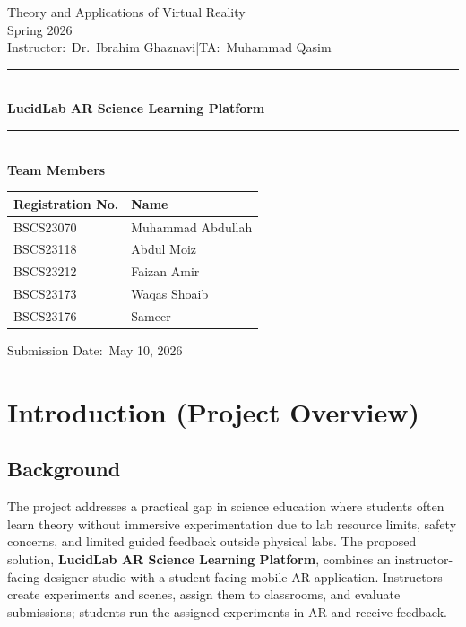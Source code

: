 \documentclass[12pt,a4paper]{article}
\newcommand{\coursename}{Theory and Applications of Virtual Reality}
\newcommand{\semester}{Spring 2026}
\newcommand{\instructor}{Dr.\ Ibrahim Ghaznavi}
\newcommand{\ta}{Muhammad Qasim}
\newcommand{\projecttitle}{LucidLab AR Science Learning Platform}
\newcommand{\submissiondate}{May 10, 2026}
\begin{document}
\begin{titlepage}
  \thispagestyle{empty}
  \begin{center}
    \vspace*{1.5cm}
    {\large \coursename}\\[0.3cm]
    {\large \semester}\\[0.2cm]
    {\small Instructor:\ \instructor \quad|\quad TA:\ \ta}\\[1.2cm]

    \rule{\textwidth}{1.2pt}\\[0.6cm]
    {\LARGE \bfseries \projecttitle}\\[0.4cm]
    \rule{\textwidth}{1.2pt}\\[1.4cm]

    {\large \bfseries Team Members}\\[0.5cm]
    \begin{tabular}{@{}ll@{}}
      \toprule
      \textbf{Registration No.} & \textbf{Name} \\
      \midrule
      BSCS23070 & Muhammad Abdullah \\
      BSCS23118 & Abdul Moiz \\
      BSCS23212 & Faizan Amir \\
      BSCS23173 & Waqas Shoaib \\
      BSCS23176 & Sameer \\
      \bottomrule
    \end{tabular}

    \vfill
    {\normalsize Submission Date:\ \submissiondate}
  \end{center}
\end{titlepage}

\section{Introduction (Project Overview)}

\subsection{Background}

The project addresses a practical gap in science education where students often learn
theory without immersive experimentation due to lab resource limits, safety concerns,
and limited guided feedback outside physical labs. The proposed solution,
\textbf{LucidLab AR Science Learning Platform}, combines an instructor-facing designer
studio with a student-facing mobile AR application. Instructors create experiments and
scenes, assign them to classrooms, and evaluate submissions; students run the assigned
experiments in AR and receive feedback.
\end{document}
